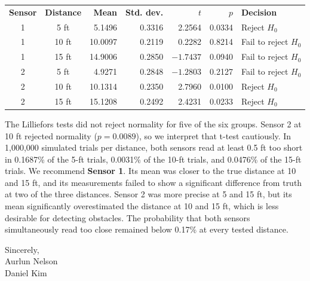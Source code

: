 \documentclass[10pt]{article}
\newcommand{\partnername}{Daniel Kim}
\begin{document}
\begin{center}
\small
{}
\begin{tabular}{ccrrrrl}
\rowcolor{vtmaroon}
\color{white}\bfseries Sensor &
\color{white}\bfseries Distance &
\color{white}\bfseries Mean &
\color{white}\bfseries Std. dev. &
\color{white}\bfseries $t$ &
\color{white}\bfseries $p$ &
\color{white}\bfseries Decision \\
1 & 5 ft  & 5.1496  & 0.3316 &  2.2564 & 0.0334 & Reject $H_0$ \\
1 & 10 ft & 10.0097 & 0.2119 &  0.2282 & 0.8214 & Fail to reject $H_0$ \\
1 & 15 ft & 14.9006 & 0.2850 & $-1.7437$ & 0.0940 & Fail to reject $H_0$ \\
2 & 5 ft  & 4.9271  & 0.2848 & $-1.2803$ & 0.2127 & Fail to reject $H_0$ \\
2 & 10 ft & 10.1314 & 0.2350 &  2.7960 & 0.0100 & Reject $H_0$ \\
2 & 15 ft & 15.1208 & 0.2492 &  2.4231 & 0.0233 & Reject $H_0$ \\
\end{tabular}
\end{center}

The Lilliefors tests did not reject normality for five of the six groups. Sensor 2 at 10 ft rejected normality ($p=0.0089$), so we interpret that t-test cautiously. In 1,000,000 simulated trials per distance, both sensors read at least 0.5 ft too short in 0.1687\% of the 5-ft trials, 0.0031\% of the 10-ft trials, and 0.0476\% of the 15-ft trials. We recommend \textbf{Sensor 1}. Its mean was closer to the true distance at 10 and 15 ft, and its measurements failed to show a significant difference from truth at two of the three distances. Sensor 2 was more precise at 5 and 15 ft, but its mean significantly overestimated the distance at 10 and 15 ft, which is less desirable for detecting obstacles. The probability that both sensors simultaneously read too close remained below 0.17\% at every tested distance.

\vspace{0.65em}
Sincerely,\\
Aurlun Nelson\\
\partnername
\end{document}
